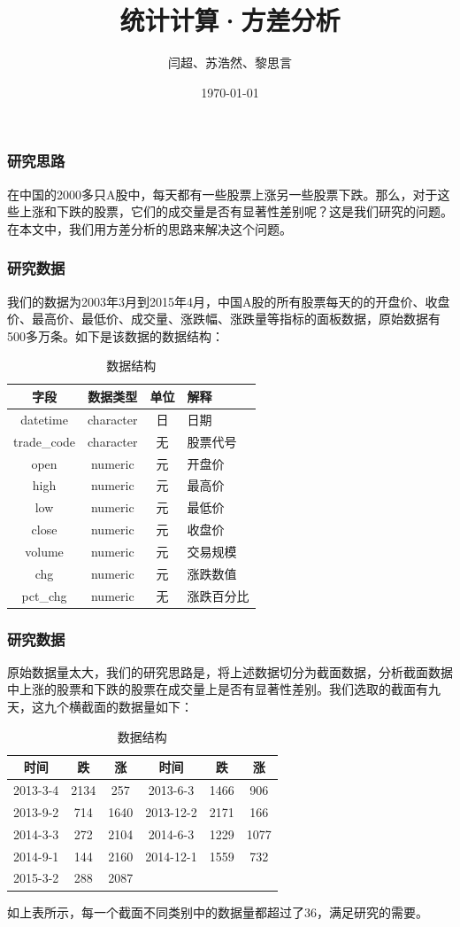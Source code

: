 \documentclass[9pt]{beamer}
\title{统计计算·方差分析}
\author{闫超、苏浩然、黎思言}
\date{\today}
\begin{document}
\begin{frame} 
\titlepage   
\end{frame}

\begin{frame}
\frametitle{研究思路}
在中国的2000多只A股中，每天都有一些股票上涨另一些股票下跌。那么，对于这些上涨和下跌的股票，它们的成交量是否有显著性差别呢？这是我们研究的问题。在本文中，我们用方差分析的思路来解决这个问题。
\end{frame}

\begin{frame}
\frametitle{研究数据}
我们的数据为2003年3月到2015年4月，中国A股的所有股票每天的的开盘价、收盘价、最高价、最低价、成交量、涨跌幅、涨跌量等指标的面板数据，原始数据有500多万条。如下是该数据的数据结构：
\begin{table}
\centering
\caption{数据结构}
\begin{tabular}{cccp{80pt}}
  \hline
    字段 & 数据类型 & 单位 & 解释 \\\hline
    datetime & character & 日 & 日期 \\
    trade\_code & character & 无  & 股票代号 \\
    open & numeric & 元 & 开盘价 \\
    high & numeric & 元 & 最高价 \\
    low & numeric & 元 & 最低价 \\
    close & numeric & 元 & 收盘价 \\
    volume & numeric & 元 & 交易规模 \\
    chg & numeric & 元 & 涨跌数值 \\
    pct\_chg & numeric & 无 & 涨跌百分比 \\
    \hline
  \end{tabular}
\end{table}
\end{frame}

\begin{frame}
\frametitle{研究数据}
原始数据量太大，我们的研究思路是，将上述数据切分为截面数据，分析截面数据中上涨的股票和下跌的股票在成交量上是否有显著性差别。我们选取的截面有九天，这九个横截面的数据量如下：
\begin{table}
\centering
\caption{数据结构}
\begin{tabular}{cccccc}
\hline
	时间&跌&涨 & 时间 & 跌 & 涨\\\hline
	2013-3-4&2134&257 & 2013-6-3&1466&906\\
	2013-9-2&714&1640 & 2013-12-2&2171&166\\
	2014-3-3&272&2104 & 2014-6-3&1229&1077\\
	2014-9-1&144&2160 & 2014-12-1&1559&732\\
	2015-3-2&288&2087\\
	\hline
\end{tabular}
\end{table}
如上表所示，每一个截面不同类别中的数据量都超过了36，满足研究的需要。
\end{frame}
\end{document}
